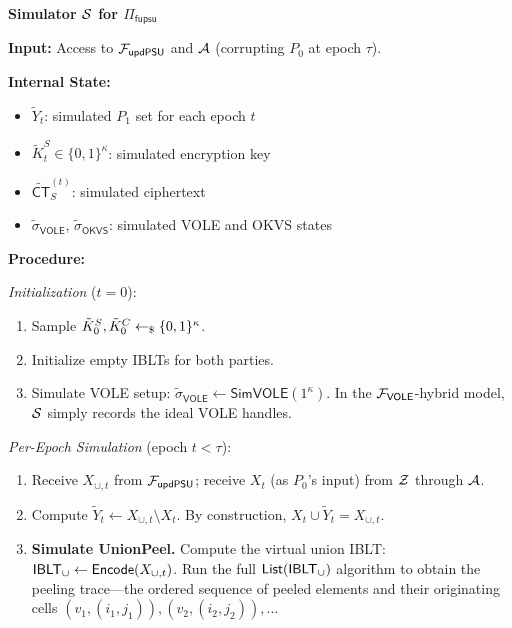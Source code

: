 \begin{framed}
\noindent\textbf{Simulator $\mathcal{S}$ for $\Pi_{\mathsf{fupsu}}$}

\smallskip\noindent\textbf{Input:} Access to $\mathcal{F}_{\mathsf{updPSU}}$ and
$\mathcal{A}$ (corrupting $P_0$ at epoch $\tau$).

\smallskip\noindent\textbf{Internal State:}
\begin{itemize}
\item $\tilde{Y}_t$: simulated $P_1$ set for each epoch $t$
\item $\tilde{K}^S_t \in \{0,1\}^\kappa$: simulated encryption key
\item $\widetilde{\mathsf{CT}}^{(t)}_S$: simulated ciphertext
\item $\tilde{\sigma}_{\mathsf{VOLE}}$, $\tilde{\sigma}_{\mathsf{OKVS}}$:
simulated VOLE and OKVS states
\end{itemize}

\smallskip\noindent\textbf{Procedure:}

\smallskip\noindent\textit{Initialization} ($t = 0$):
\begin{enumerate}
\item Sample $\tilde{K}^S_0, \tilde{K}^C_0 \leftarrow_{\$} \{0,1\}^\kappa$.
\item Initialize empty IBLTs for both parties.
\item Simulate VOLE setup: $\tilde{\sigma}_{\mathsf{VOLE}} \leftarrow
\textsf{SimVOLE}(1^\kappa)$. In the $\mathcal{F}_{\mathsf{VOLE}}$-hybrid model,
$\mathcal{S}$ simply records the ideal VOLE handles.
\end{enumerate}

\smallskip\noindent\textit{Per-Epoch Simulation} (epoch $t < \tau$):
\begin{enumerate}
\item Receive $X_{\cup,t}$ from $\mathcal{F}_{\mathsf{updPSU}}$; receive $X_t$ (as
$P_0$'s input) from $\mathcal{Z}$ through $\mathcal{A}$.
\item Compute $\tilde{Y}_t \leftarrow X_{\cup,t} \setminus X_t$. By
construction, $X_t \cup \tilde{Y}_t = X_{\cup,t}$.
\item \textbf{Simulate UnionPeel.} Compute the virtual union IBLT:
$\mathsf{IBLT}_\cup \leftarrow \mathsf{Encode}(X_{\cup,t})$. Run the full
$\mathsf{List}(\mathsf{IBLT}_\cup)$ algorithm to obtain the peeling trace---the
ordered sequence of peeled elements and their originating cells
$(v_1, (i_1, j_1)), (v_2, (i_2, j_2)), \dots$


\end{enumerate}
\end{framed}

